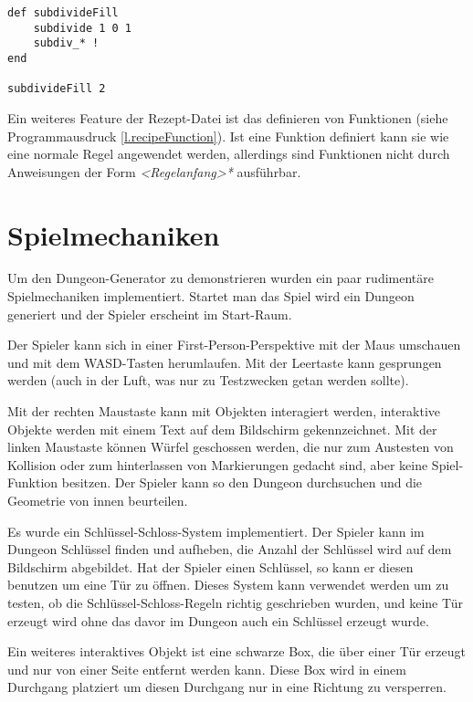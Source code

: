 \begin{lstlisting}[label=l.recipeFunction, caption={Beispiel einer Funktionsdefinition in der Rezept-Datei}] 
def subdivideFill
    subdivide 1 0 1
    subdiv_* !
end

subdivideFill 2
\end{lstlisting} 
Ein weiteres Feature der Rezept-Datei ist das definieren von Funktionen (siehe Programmausdruck \ref{l.recipeFunction}). Ist eine Funktion definiert kann sie wie eine normale Regel angewendet werden, allerdings sind Funktionen nicht durch Anweisungen der Form \textit{<Regelanfang>*} ausführbar.


\section{Spielmechaniken}\label{s.spielmechaniken}

Um den Dungeon-Generator zu demonstrieren wurden ein paar rudimentäre Spielmechaniken implementiert. Startet man das Spiel wird ein Dungeon generiert und der Spieler erscheint im Start-Raum.

Der Spieler kann sich in einer First-Person-Perspektive mit der Maus umschauen und mit dem WASD-Tasten herumlaufen. Mit der Leertaste kann gesprungen werden (auch in der Luft, was nur zu Testzwecken getan werden sollte).

Mit der rechten Maustaste kann mit Objekten interagiert werden, interaktive Objekte werden mit einem Text auf dem Bildschirm gekennzeichnet. Mit der linken Maustaste können Würfel geschossen werden, die nur zum Austesten von Kollision oder zum hinterlassen von Markierungen gedacht sind, aber keine Spiel-Funktion besitzen. Der Spieler kann so den Dungeon durchsuchen und die Geometrie von innen beurteilen. 

Es wurde ein Schlüssel-Schloss-System implementiert. Der Spieler kann im Dungeon Schlüssel finden und aufheben, die Anzahl der Schlüssel wird auf dem Bildschirm abgebildet. Hat der Spieler einen Schlüssel, so kann er diesen benutzen um eine Tür zu öffnen. Dieses System kann verwendet werden um zu testen, ob die Schlüssel-Schloss-Regeln richtig geschrieben wurden, und keine Tür erzeugt wird ohne das davor im Dungeon auch ein Schlüssel erzeugt wurde.

Ein weiteres interaktives Objekt ist eine schwarze Box, die über einer Tür erzeugt und nur von einer Seite entfernt werden kann. Diese Box wird in einem Durchgang platziert um diesen Durchgang nur in eine Richtung zu versperren.

